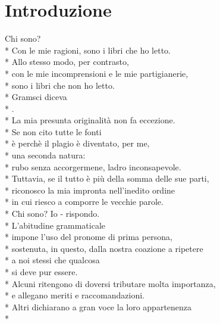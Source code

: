 \documentclass[12pt]{book}
\begin{document}
\maketitle
\makededication


\frontmatter


\renewcommand*{\topname}{Indice} %
\maketop


\section{Introduzione}
Chi sono? \\*
Con le mie ragioni, sono i libri che ho letto. \\*
Allo stesso modo, per contrasto, \\*
con le mie incomprensioni e le mie partigianerie, \\*
sono i libri che non ho letto. \\*
Gramsci diceva \\*
. \\*
La mia presunta originalità non fa eccezione. \\*
Se non cito tutte le fonti \\*
è perchè il plagio è diventato, per me, \\*
una seconda natura: \\*
rubo senza accorgermene, ladro inconsapevole. \\*
Tuttavia, se il tutto è più della somma delle sue parti, \\*
riconosco la mia impronta nell'inedito ordine \\*
in cui riesco a comporre le vecchie parole. \\*
Chi sono? Io - rispondo. \\*
L'abitudine grammaticale \\*
impone l'uso del pronome di prima persona, \\*
sostenuta, in questo, dalla nostra coazione a ripetere \\*
a noi stessi che qualcosa \\*
si deve pur essere. \\*
Alcuni ritengono di doversi tributare molta importanza,\\*
e allegano meriti e raccomandazioni. \\*
Altri dichiarano a gran voce la loro appartenenza \\*
\end{document}
